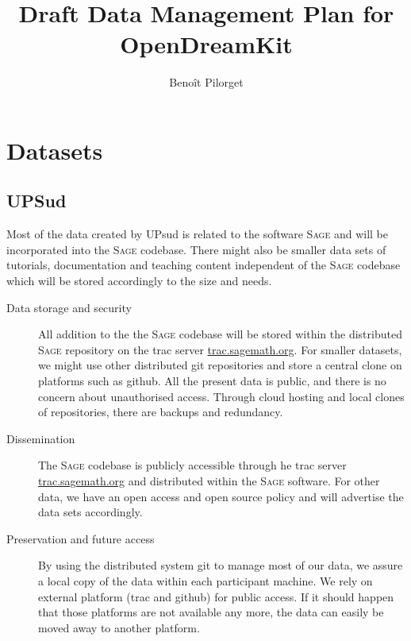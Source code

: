 \documentclass[12pt]{amsbook}
\title{Draft Data Management Plan for OpenDreamKit}
\author{Benoît Pilorget}
\newcommand{\software}[1]{\textsc{#1}\xspace}
\newcommand{\Sage}{\software{Sage}}
\begin{document}
\maketitle

\section{Datasets}



\subsection{UPSud}

Most of the data created by UPsud is related to the software \Sage and will be incorporated into the \Sage codebase. There might also be smaller data sets of tutorials, documentation and teaching content independent of the \Sage codebase which will be stored accordingly to the size and needs.
\begin{description}
\item[Data storage and security] All addition to the the \Sage codebase will be stored within the distributed \Sage repository on the trac server \href{http://trac.sagemath.org/}{trac.sagemath.org}. For smaller datasets, we might use other distributed git repositories and store a central clone on platforms such as github. All the present data is public, and there is no concern about
unauthorised access. Through cloud hosting and local clones of
repositories, there are backups and redundancy.
\item[Dissemination] The \Sage codebase is publicly accessible through he trac server \href{http://trac.sagemath.org/}{trac.sagemath.org} and distributed within the \Sage software. For other data, we have an open access and open source policy and will advertise the data sets accordingly.
\item[Preservation and future access] By using the distributed system git to manage most of our data, we assure a local copy of the data within each participant machine. We rely on external platform (trac and github) for public access. If it should happen that those platforms are not available any more, the data can easily be moved away to another platform.
\end{description}
\end{document}
